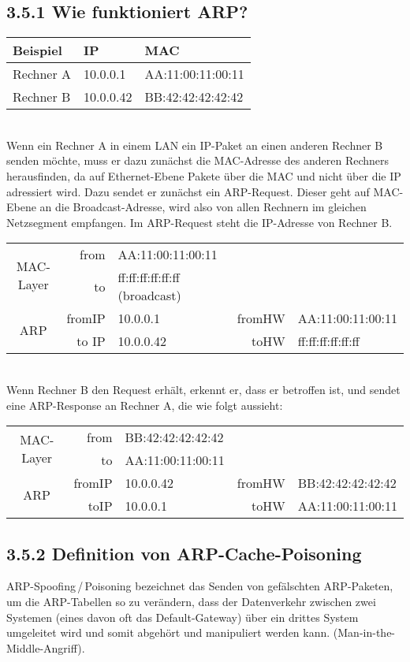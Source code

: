 \documentclass[a4paper,
			llpt,
			solution,
			accentcolor=tud2d,
			colorbacktitle
			]
			{tudexercise}
\newcommand{\8}{$\infty$}
\begin{document}
\subsection{3.5.1 Wie funktioniert ARP?}
\begin{tabular}{l|l|l}
Beispiel        &    IP      &           MAC \\ \hline
Rechner A &    10.0.0.1     &       AA:11:00:11:00:11 \\
Rechner B &    10.0.0.42      &     BB:42:42:42:42:42\\
\end{tabular}\\
Wenn ein Rechner A in einem LAN ein IP-Paket an einen anderen Rechner B
senden möchte, muss er dazu zunächst die MAC-Adresse des anderen Rechners
herausfinden, da auf Ethernet-Ebene Pakete über die MAC und nicht über die IP
adressiert wird.
Dazu sendet er zunächst ein ARP-Request. Dieser geht auf MAC-Ebene an die
Broadcast-Adresse, wird also von allen Rechnern im gleichen Netzsegment
empfangen. Im ARP-Request steht die IP-Adresse von Rechner B.
\begin{tabular}{c|r l r l}
\multirow{2}{*}{MAC-Layer}  &  from & AA:11:00:11:00:11 \\
           &   to  & ff:ff:ff:ff:ff:ff (broadcast) \\ \hline
\multirow{2}{*}{ARP}   &      fromIP& 10.0.0.1   & fromHW & AA:11:00:11:00:11 \\
      &      to IP &  10.0.0.42 &  toHW &   ff:ff:ff:ff:ff:ff \\
\end{tabular}\\
Wenn Rechner B den Request erhält, erkennt er, dass er betroffen ist, und sendet eine ARP-Response an Rechner A, die wie folgt aussieht:\\
\begin{tabular}{c|r l r l}
\multirow{2}{*}{MAC-Layer} &  from&  BB:42:42:42:42:42 \\
          &  to  &  AA:11:00:11:00:11 \\ \hline
\multirow{2}{*}{ARP}      & fromIP & 10.0.0.42 &  fromHW & BB:42:42:42:42:42 \\
          &  toIP & 10.0.0.1  & toHW  &  AA:11:00:11:00:11\\
\end{tabular}

\subsection{3.5.2 Definition von ARP-Cache-Poisoning}
ARP-Spoofing\,/\,Poisoning bezeichnet das Senden von gefälschten ARP-Paketen, um die ARP-Tabellen so zu verändern, dass der Datenverkehr zwischen zwei Systemen (eines davon oft das Default-Gateway) über ein drittes System umgeleitet wird und somit abgehört und manipuliert werden kann. (Man-in-the-Middle-Angriff).
\end{document}
